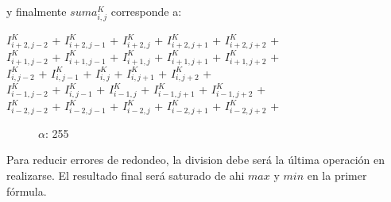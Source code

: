 y finalmente $suma_{i,j}^{K}$ corresponde a:

\begin{center}
$I_{i+2,j-2}^{K}$ + $I_{i+2,j-1}^{K}$ + $I_{i+2,j}^{K}$ + $I_{i+2,j+1}^{K}$ + $I_{i+2,j+2}^{K}$ +\\
$I_{i+1,j-2}^{K}$ + $I_{i+1,j-1}^{K}$ + $I_{i+1,j}^{K}$ + $I_{i+1,j+1}^{K}$ + $I_{i+1,j+2}^{K}$ +\\
$I_{i,j-2}^{K}$ + $I_{i,j-1}^{K}$ + $I_{i,j}^{K}$ + $I_{i,j+1}^{K}$ + $I_{i,j+2}^{K}$ +\\
$I_{i-1,j-2}^{K}$ + $I_{i,j-1}^{K}$ + $I_{i-1,j}^{K}$ + $I_{i-1,j+1}^{K}$ + $I_{i-1,j+2}^{K}$ +\\ 
$I_{i-2,j-2}^{K}$ + $I_{i-2,j-1}^{K}$ + $I_{i-2,j}^{K}$ + $I_{i-2,j+1}^{K}$ + $I_{i-2,j+2}^{K}$ +\\
\end{center}

\newpage

\begin{figure}
  \centering
  \hfill
  \caption{$\alpha$: 255}
\end{figure}


Para reducir errores de redondeo, la division debe será la última operación en realizarse.
El resultado final será saturado de ahi $max$ y $min$ en la primer fórmula.

